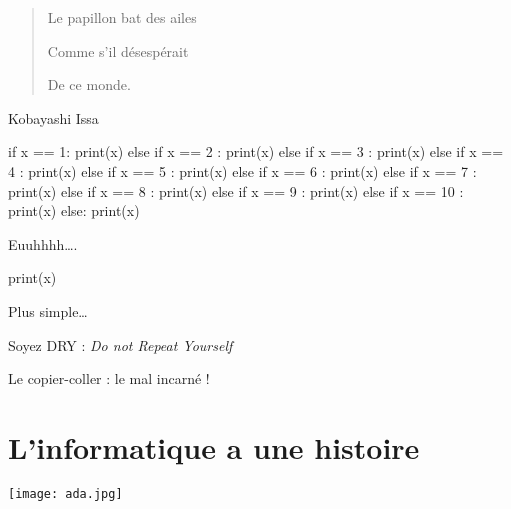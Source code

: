 \documentclass[french]{beamer}
\begin{document}
\begin{frame}

\begin{quote}
Le papillon bat des ailes

Comme s'il désespérait

De ce monde.
\end{quote}

Kobayashi Issa

\end{frame}


\begin{frame}[fragile]

  \begin{pythoncode}
if x == 1:
   print(x)
else if x == 2 :
   print(x)
else if x == 3 :
   print(x)
else if x == 4 :
   print(x)
else if x == 5 :
   print(x)
else if x == 6 :
   print(x)
else if x == 7 :
   print(x)
else if x == 8 :
   print(x)
else if x == 9 :
   print(x)
else if x == 10 :
   print(x)
else:
   print(x)
\end{pythoncode}




Euuhhhh\ldots{}.

\end{frame}

\begin{frame}[fragile]

  \begin{pythoncode}
print(x)
\end{pythoncode}




Plus simple\ldots{}

Soyez DRY : \emph{Do not Repeat Yourself}

Le copier-coller : le mal incarné !

\end{frame}




\section{L'informatique a une histoire}


\begin{frame}
  \begin{center}
\texttt{[image: ada.jpg]}
    
  \end{center}


\end{frame}
\end{document}
